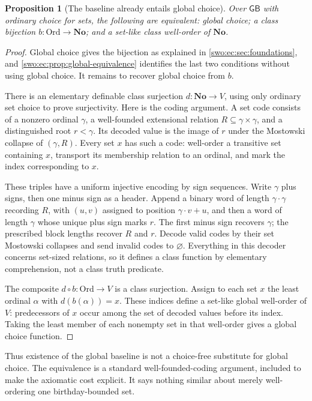 \documentclass[11pt]{article}
\newtheorem{proposition}[proposition]{Proposition}
\theoremstyle{definition}
\theoremstyle{remark}
\newcommand{\No}{\mathbf{No}}
\newcommand{\Ord}{\mathrm{Ord}}
\newcommand{\GB}{\mathsf{GB}}
\begin{document}
\begin{proposition}[The baseline already entails global choice]
\label{swo:ec:prop:baseline-choice}
Over $\GB$ with ordinary choice for sets, the following are equivalent:
global choice; a class bijection $b:\Ord\to\No$; and a set-like class
well-order of $\No$.
\end{proposition}
\begin{proof}
Global choice gives the bijection as explained in
\cref{swo:ec:sec:foundations}, and \cref{swo:ec:prop:global-equivalence} identifies the
last two conditions without using global choice. It remains to recover
global choice from $b$.

There is an elementary definable class surjection $d:\No\to V$, using
only ordinary set choice to prove surjectivity. Here is the coding
argument. A set code consists of a nonzero ordinal $\gamma$, a
well-founded extensional relation $R\subseteq\gamma\times\gamma$, and
a distinguished root $r<\gamma$. Its decoded value is the image of $r$
under the Mostowski collapse of $(\gamma,R)$. Every set $x$ has such a
code: well-order a transitive set containing $x$, transport its membership
relation to an ordinal, and mark the index corresponding to $x$.

These triples have a uniform injective encoding by sign sequences. Write
$\gamma$ plus signs, then one minus sign as a header. Append a binary
word of length $\gamma\cdot\gamma$ recording $R$, with $(u,v)$ assigned
to position $\gamma\cdot v+u$, and then a word of length $\gamma$ whose
unique plus sign marks $r$. The first minus sign recovers $\gamma$;
the prescribed block lengths recover $R$ and $r$. Decode valid codes
by their set Mostowski collapses and send invalid codes to $\varnothing$.
Everything in this decoder concerns set-sized relations, so it defines
a class function by elementary comprehension, not a class truth predicate.

The composite $d\circ b:\Ord\to V$ is a class surjection. Assign to
each set $x$ the least ordinal $\alpha$ with $d(b(\alpha))=x$. These
indices define a set-like global well-order of $V$: predecessors of
$x$ occur among the set of decoded values before its index. Taking the
least member of each nonempty set in that well-order gives a global
choice function.
\end{proof}

Thus existence of the global baseline is not a choice-free substitute
for global choice. The equivalence is a standard well-founded-coding
argument, included to make the axiomatic cost explicit. It says nothing
similar about merely well-ordering one birthday-bounded set.
\end{document}

